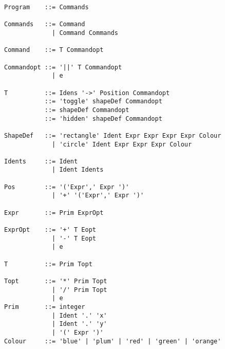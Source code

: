 \documentclass[a4paper]{article}
\begin{document}
\begin{verbatim}
Program    ::= Commands

Commands   ::= Command
             | Command Commands

Command    ::= T Commandopt

Commandopt ::= '||' T Commandopt
             | e

T          ::= Idens '->' Position Commandopt
           ::= 'toggle' shapeDef Commandopt
           ::= shapeDef Commandopt
           ::= 'hidden' shapeDef Commandopt

ShapeDef   ::= 'rectangle' Ident Expr Expr Expr Expr Colour
             | 'circle' Ident Expr Expr Expr Colour

Idents     ::= Ident
             | Ident Idents

Pos        ::= '('Expr',' Expr ')'
             | '+' '('Expr',' Expr ')'

Expr       ::= Prim ExprOpt

ExprOpt    ::= '+' T Eopt
             | '-' T Eopt
             | e

T          ::= Prim Topt

Topt       ::= '*' Prim Topt
             | '/' Prim Topt
             | e
Prim       ::= integer
             | Ident '.' 'x'
             | Ident '.' 'y'
             | '(' Expr ')'
Colour     ::= 'blue' | 'plum' | 'red' | 'green' | 'orange'
\end{verbatim}
\end{document}
